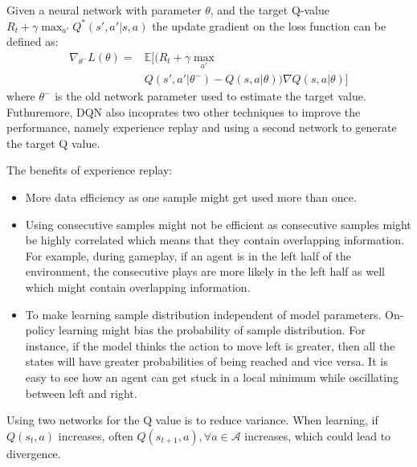 \documentclass{article}
\begin{document}
\begin{multicols*}{2}
		Given a neural network with parameter $ \theta $, and the target Q-value $ R_t + \gamma \max_{a'} Q^*(s', a' | s, a) $ the update gradient on the loss function can be defined as: 
		\begin{equation*}
		\begin{split}
		\nabla_{\theta^-}L(\theta) =  &  \mathbb{E}[(R_t + \gamma \max_{a'}\\
		&Q(s', a' | \theta^-) - Q(s, a | \theta)) \nabla Q(s, a | \theta) ] 
		\end{split}
		\end{equation*}
		where $ \theta^-$ is the old network parameter used to estimate the target value. Futhuremore, DQN also incoprates two other techniques to improve the performance, namely experience replay and using a second network  to generate the target Q value. 
		
		The benefits of experience replay:
		\begin{itemize}
		\item More data efficiency as one sample might get used more than once.
		\item Using consecutive samples might not be efficient as consecutive samples might be highly correlated which means that they contain overlapping information. For example, during gameplay, if an agent is in the left half of the environment, the consecutive plays are more likely in the left half as well which might contain overlapping information.
		\item To make learning sample distribution independent of model parameters. On-policy learning might bias the probability of sample distribution. For instance, if the model thinks the action to move left is greater, then all the states will have greater probabilities of being reached and vice versa. It is easy to see how an agent can get stuck in a local minimum while oscillating between left and right.
		\end{itemize}
		
		Using two networks for the Q value is to reduce variance. When learning, if $ Q(s_{t}, a) $ increases, often $ Q(s_{t+1}, a), \forall a \in \mathcal{A} $ increases, which could lead to divergence.
		
	\end{multicols*}
\end{document}
